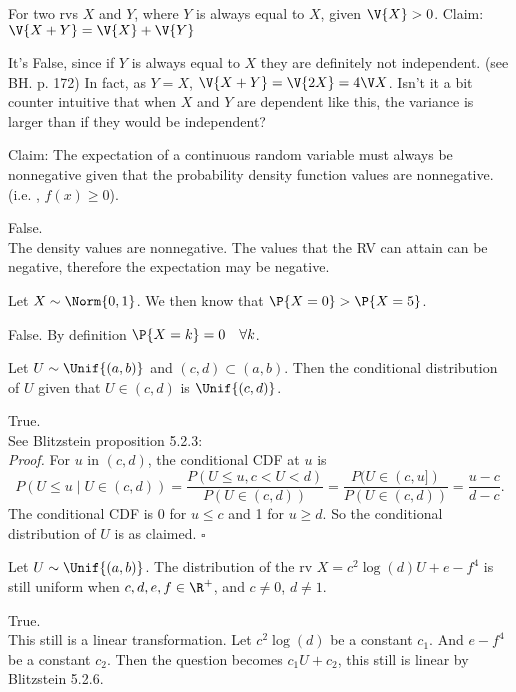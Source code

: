 \documentclass[tf-tutorial-all.tex]{subfiles}
\begin{document}
\begin{truefalse}
For two rvs $X$ and $Y$, where $Y$ is always equal to $X$, given $\V{X}>0$. Claim: $\V{X+Y} = \V{X} + \V{Y}$
\begin{solution}
It's False, since if $Y$ is always equal to $X$ they are definitely not independent.
(see BH. p. 172) In fact, as $Y=X$, $\V{X+Y} = \V{2X} = 4 \V X$.
Isn't it a bit counter intuitive that when $X$ and $Y$ are dependent like this, the variance is larger than if they would be independent?
\end{solution}
\end{truefalse}

\begin{truefalse}
Claim: The expectation of a continuous random variable must always be nonnegative given that the probability density function values are nonnegative. (i.e. , $f(x) \geq 0$).
\begin{solution}
False.\\
The density values are nonnegative. The values that the RV can attain can be negative, therefore the expectation may be negative.
\end{solution}
\end{truefalse}

\begin{truefalse}
Let $X \sim \Norm{0, 1}$. We then know that $\P{X = 0} > \P{X = 5}$.
\begin{solution}
False. By definition $\P{X = k} = 0 \quad \forall k $.
\end{solution}
\end{truefalse}

\begin{truefalse}
Let $U \sim \Unif{(a,b)}$ and  $(c,d) \subset (a,b)$. Then the conditional distribution of $U$ given that $U \in (c,d)$ is $\Unif{(c,d)}$.
\begin{solution}
True.
\\See Blitzstein proposition 5.2.3:\\
\textit{Proof.} For $u$ in $(c, d)$, the conditional CDF at $u$ is
$$
P(U \leq u \mid U \in(c, d))=\frac{P(U \leq u, c<U<d)}{P(U \in(c, d))}=\frac{P(U \in(c, u])}{P(U \in(c, d))}=\frac{u-c}{d-c} .
$$
The conditional CDF is 0 for $u \leq c$ and 1 for $u \geq d$. So the conditional distribution of $U$ is as claimed.
$\square$
\end{solution}
\end{truefalse}

\begin{truefalse}
Let $U \sim \Unif{(a,b)}$. The distribution of the rv $X = c^{2} \log(d) U + e - f^{4}$ is still uniform when $c,d, e, f \in \R^{+}$, and $c\neq 0$, $d\neq 1.$
\begin{solution}
True.\\
This still is a linear transformation. Let $c^{2} \log(d)$ be a constant $c_{1}$. And $e - f^{4}$ be a constant $c_{2}$. Then the question becomes $c_{1} U + c_{2} $, this still is linear by Blitzstein 5.2.6.
\end{solution}
\end{truefalse}
\end{document}
